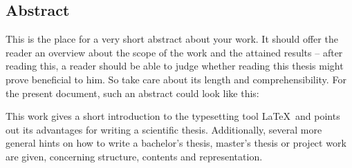 \subsection*{Abstract}
This is the place for a very short abstract about your work. 
It should offer the reader an overview about the scope of the work and the attained results -- after reading this, a reader should be able to judge whether reading this thesis might prove beneficial to him.
So take care about its length and comprehensibility.
For the present document, such an abstract could look like this:

This work gives a short introduction to the typesetting tool \LaTeX\ and points out its advantages for writing a scientific thesis. 
Additionally, several more general hints on how to write a bachelor's thesis, master's thesis or project work are given, concerning structure, contents and representation.


